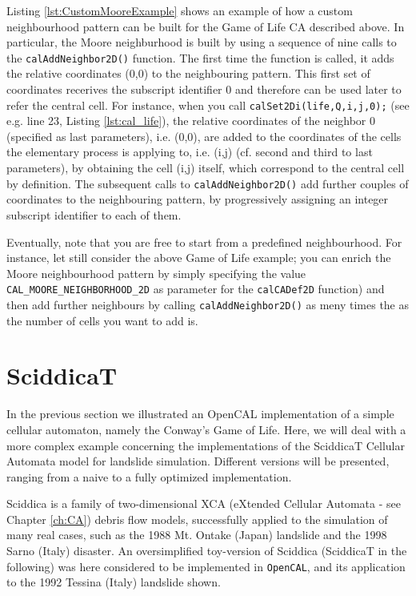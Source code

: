 Listing \ref{lst:CustomMooreExample} shows an example of how a custom
neighbourhood pattern can be built for the Game of Life CA described
above. In particular, the Moore neighburhood is built by using a
sequence of nine calls to the \verb'calAddNeighbor2D()' function. The
first time the function is called, it adds the relative coordinates
(0,0) to the neighbouring pattern. This first set of coordinates
recerives the subscript identifier 0 and therefore can be used later
to refer the central cell. For instance, when you call
\verb'calSet2Di(life,Q,i,j,0);' (see e.g. line 23, Listing
\ref{lst:cal_life}), the relative coordinates of the neighbor 0
(specified as last parameters), i.e. (0,0), are added to the
coordinates of the cells the elementary process is applying to,
i.e. (i,j) (cf. second and third to last parameters), by obtaining
the cell (i,j) itself, which correspond to the central cell by
definition. The subsequent calls to \verb'calAddNeighbor2D()' add
further couples of coordinates to the neighbouring pattern, by
progressively assigning an integer subscript identifier to each of
them.

Eventually, note that you are free to start from a predefined
neighbourhood. For instance, let still consider the above Game of Life
example; you can enrich the Moore neighbourhood pattern by simply
specifying the value \verb'CAL_MOORE_NEIGHBORHOOD_2D' as parameter for
the \verb'calCADef2D' function) and then add further neighbours by
calling \verb'calAddNeighbor2D()' as meny times the as the number of
cells you want to add is.

\section{SciddicaT}\label{sec:sciddicaT}
In the previous section we illustrated an OpenCAL implementation of a
simple cellular automaton, namely the Conway’s Game of Life. Here, we
will deal with a more complex example concerning the implementations
of the SciddicaT Cellular Automata model for landslide
simulation. Different versions will be presented, ranging from a naive
to a fully optimized implementation.

Sciddica is a family of two-dimensional XCA (eXtended Cellular
Automata - see Chapter \ref{ch:CA}) debris flow models, successfully
applied to the simulation of many real cases, such as the 1988
Mt. Ontake (Japan) landslide and the 1998 Sarno (Italy) disaster. An
oversimplified toy-version of Sciddica (SciddicaT in the following)
was here considered to be implemented in \verb"OpenCAL", and its
application to the 1992 Tessina (Italy) landslide shown.

